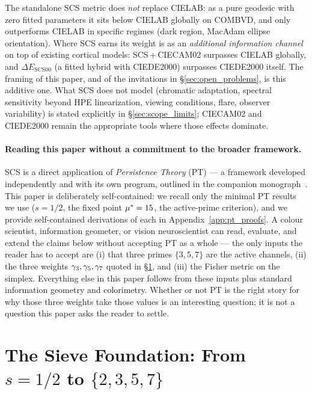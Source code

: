 \documentclass[12pt,a4paper]{article}
\begin{document}
The standalone SCS metric does \emph{not} replace CIELAB: as a pure
geodesic with zero fitted parameters it sits below CIELAB globally on
COMBVD, and only outperforms CIELAB in specific regimes (dark region,
MacAdam ellipse orientation). Where SCS earns its weight is as an
\emph{additional information channel} on top of existing cortical
models: SCS\,+\,CIECAM02 surpasses CIELAB globally, and
$\Delta E_{\mathrm{SCS00}}$ (a fitted hybrid with CIEDE2000) surpasses
CIEDE2000 itself. The framing of this paper, and of the invitations in
\S\ref{sec:open_problems}, is this additive one. What SCS does not
model (chromatic adaptation, spectral sensitivity beyond HPE
linearization, viewing conditions, flare, observer variability) is
stated explicitly in \S\ref{sec:scope_limits}; CIECAM02 and CIEDE2000
remain the appropriate tools where those effects dominate.

\paragraph{Reading this paper without a commitment to the broader framework.}
SCS is a direct application of \emph{Persistence Theory} (PT) ---
a framework developed independently and with its own program,
outlined in the companion monograph~\cite{senez2026math}. This paper is
deliberately self-contained: we recall only the minimal PT results we
use ($s = 1/2$, the fixed point ${\mu^{*}} = 15$, the active-prime
criterion), and we provide self-contained derivations of each in
Appendix~\ref{app:pt_proofs}. A colour scientist, information
geometer, or vision neuroscientist can read, evaluate, and extend the
claims below without accepting PT as a whole --- the only inputs the
reader has to accept are (i) that three primes $\{3, 5, 7\}$ are the
active channels, (ii) the three weights $\gamma_{3}, \gamma_{5}, \gamma_{7}$
quoted in \S\ref{sec:foundation}, and (iii) the Fisher metric on the
simplex. Everything else in this paper follows from these inputs plus
standard information geometry and colorimetry. Whether or not PT is
the right story for why those three weights take those values is an
interesting question; it is not a question this paper asks the reader
to settle.

\section{The Sieve Foundation: From $s = 1/2$ to $\{2, 3, 5, 7\}$}
\label{sec:foundation}
\end{document}
